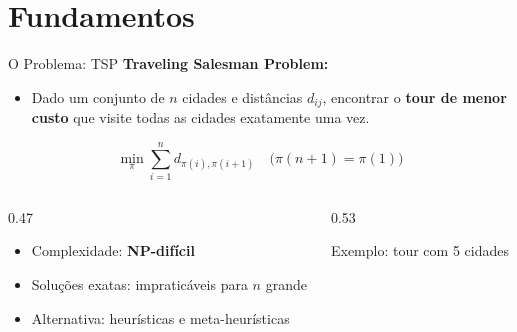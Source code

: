 \documentclass[11pt, xcolor=dvipsnames]{beamer}
\newcommand{\destaque}[1]{\textbf{\textcolor{verde}{#1}}}
\newcommand{\sutil}[1]{\textcolor{textoBase!60}{#1}}
\begin{document}
\section{Fundamentos}

\begin{frame}{O Problema: TSP}
  \footnotesize
  \textbf{Traveling Salesman Problem:}
  \vspace{2mm}
  \begin{itemize}
    \item Dado um conjunto de $n$ cidades e distâncias $d_{ij}$, encontrar o \destaque{tour de menor custo} que visite todas as cidades exatamente uma vez.
  \end{itemize}
  \vspace{2mm}
  \[
    \min_{\pi} \sum_{i=1}^{n} d_{\pi(i), \pi(i+1)} \quad \big( \pi(n+1) = \pi(1) \big)
  \]
  \vspace{2mm}
  \begin{columns}[T]
    \begin{column}{0.47\textwidth}
      \begin{itemize}
        \item Complexidade: \destaque{NP-difícil}
        \item Soluções exatas: impraticáveis para $n$ grande
        \item Alternativa: heurísticas e meta-heurísticas
      \end{itemize}
    \end{column}
    \begin{column}{0.53\textwidth}
      \centering
      \vspace{1mm}
      {\scriptsize \sutil{\footnotesize Exemplo: tour com 5 cidades}}
    \end{column}
  \end{columns}
\end{frame}
\end{document}
